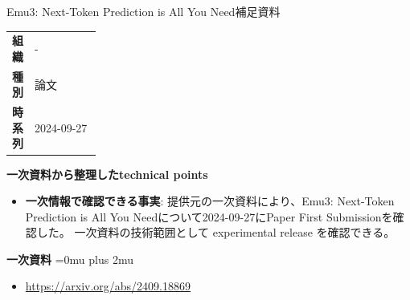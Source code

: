 \begin{technicalnote}{Emu3: Next-Token Prediction is All You Need}{補足資料}
\begingroup
\begin{tabularx}{\linewidth}{@{}>{\bfseries}p{0.22\linewidth}X@{}}
組織 & - \\
種別 & 論文 \\
時系列 & 2024-09-27 \\
\end{tabularx}
\smallskip
{\bfseries 一次資料から整理したtechnical points}
\begin{itemize}[leftmargin=1.5em,itemsep=0.35em]
\item \textbf{一次情報で確認できる事実}: 提供元の一次資料により、Emu3: Next-Token Prediction is All You Needについて2024-09-27にPaper First Submissionを確認した。 一次資料の技術範囲として experimental release を確認できる。
\end{itemize}
\begin{minipage}{\linewidth}
\begin{samepage}
{\bfseries 一次資料}
\begingroup\sloppy
\Urlmuskip=0mu plus 2mu\relax
\begin{itemize}[leftmargin=1.5em,itemsep=0.25em]
\item {\scriptsize\url{https://arxiv.org/abs/2409.18869}}
\end{itemize}
\endgroup
\end{samepage}
\end{minipage}
\endgroup
\end{technicalnote}
\medskip

